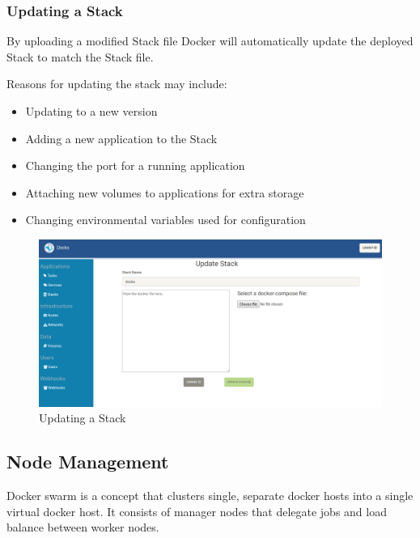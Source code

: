 \documentclass[]{article}
\begin{document}
\subsubsection{Updating a Stack}
\label{sec:stacks_update}

By uploading a modified Stack file Docker will automatically update the deployed
Stack to match the Stack file.

Reasons for updating the stack may include:
\begin{itemize}
	\item Updating to a new version
	\item Adding a new application to the Stack
	\item Changing the port for a running application
	\item Attaching new volumes to applications for extra storage
	\item Changing environmental variables used for configuration
\end{itemize}

\begin{figure}[H]
	\centering
	\includegraphics[scale=0.4]{stacks_edit.png}
	\caption{Updating a Stack}
\end{figure}

\subsection{Node Management}
Docker swarm is a concept that clusters single, separate docker hosts into a single
virtual docker host. It consists of manager nodes that delegate jobs and load balance between
worker nodes.
\end{document}
